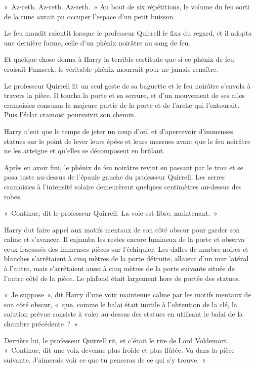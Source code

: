 «~Az-reth.
Az-reth.
Az-reth.~»
Au bout de six répétitions, le volume du feu sorti de la rune aurait pu occuper l'espace d'un petit buisson.

Le feu maudit ralentit lorsque le professeur Quirrell le fixa du regard, et il adopta une dernière forme, celle d'un phénix noirâtre au sang de feu.

Et quelque chose donna à Harry la terrible certitude que si ce phénix de feu croisait Fumseck, le véritable phénix mourrait pour ne jamais renaître.

Le professeur Quirrell fit un seul geste de sa baguette et le feu noirâtre s'envola à travers la pièce.
Il toucha la porte et sa serrure, et d'un mouvement de ses ailes cramoisies consuma la majeure partie de la porte et de l'arche qui l'entourait.
Puis l'éclat cramoisi poursuivit son chemin.

Harry n'eut que le temps de jeter un coup d'œil et d'apercevoir d'immenses statues sur le point de lever leurs épées et leurs massues avant que le feu noirâtre ne les atteigne et qu'elles se décomposent en brûlant.

Après en avoir fini, le phénix de feu noirâtre revint en passant par le trou et se posa juste au-dessus de l'épaule gauche du professeur Quirrell.
Les serres cramoisies à l'intensité solaire demeurèrent quelques centimètres au-dessus des robes.

«~Continue, dit le professeur Quirrell.
La voie est libre, maintenant.~»

Harry dut faire appel aux motifs mentaux de son côté obscur pour garder son calme et s'avancer.
Il enjamba les restes encore lumineux de la porte et observa ceux fracassés des immenses pièces sur l'échiquier.
Les dalles de marbre noires et blanches s'arrêtaient à cinq mètres de la porte détruite, allaient d'un mur latéral à l'autre, mais s'arrêtaient aussi à cinq mètres de la porte suivante située de l'autre côté de la pièce.
Le plafond était largement hors de portée des statues.

«~Je suppose~», dit Harry d'une voix maintenue calme par les motifs mentaux de son côté obscur, «~que, comme le balai était inutile à l'obtention de la clé, la solution prévue consiste à voler au-dessus des statues en utilisant le balai de la chambre précédente~?~»

Derrière lui, le professeur Quirrell rit, et c'était le rire de Lord Voldemort.
«~Continue, dit une voix devenue plus froide et plus flûtée.
Va dans la pièce suivante.
J'aimerais voir ce que tu penseras de ce qui s'y trouve.~»

